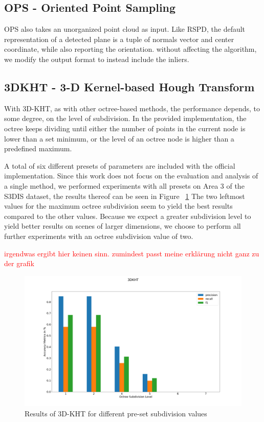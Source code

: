 \documentclass[main.tex]{subfiles}
\begin{document}
\subsection*{OPS - Oriented Point Sampling}
OPS also takes an unorganized point cloud as input. Like RSPD, the default representation of a detected plane is 
a tuple of normals vector and center coordinate, while also reporting the orientation.
without affecting the algorithm, we modify the output format to instead include the inliers. 

\subsection*{3DKHT - 3-D Kernel-based Hough Transform}
With 3D-KHT, as with other octree-based methods, the performance depends, to some degree, on the level of subdivision.
In the provided implementation, the octree keeps dividing until either the number of points in the current node is lower than a set minimum, or the
level of an octree node is higher than a predefined maximum.

A total of six different presets of parameters are included with the official implementation.
Since this work does not focus on the evaluation and analysis of a single method, we performed experiments with all presets on Area 3 of the S3DIS\cite{armeni_cvpr16} dataset, the
results thereof can be seen in Figure ~\ref{fig:3dkht_params}
The two leftmost values for the maximum octree subdivision seem to yield the best results compared to the other values.
Because we expect a greater subdivision level to yield better results on scenes of larger dimensions, we choose to perform 
all further experiments with an octree subdivision value of two.

\textcolor{red}{irgendwas ergibt hier keinen sinn. zumindest passt meine erklärung nicht ganz zu der grafik}

\begin{figure}[!ht]
    \centering
    \includegraphics[width=15 cm]{images/params_3dkht.png}
    \caption[3D-KHT Parameter Benchmark Results]{Results of 3D-KHT for different pre-set subdivision values}
    \label{fig:3dkht_params}
\end{figure}
\end{document}
